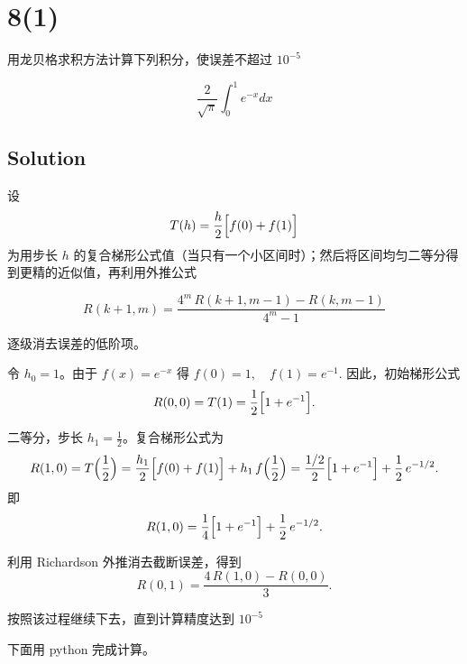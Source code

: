 \documentclass[11pt]{article}
\begin{document}
    \section{8(1)}\label{section}

用龙贝格求积方法计算下列积分，使误差不超过 \(10^{-5}\)

\[
\frac{2}{\sqrt \pi} \int_0^1e^{-x} dx
\]

\subsection{Solution}\label{solution}

设\\
\[
T(h)=\frac{h}{2}\Bigl[f(0)+f(1)\Bigr]
\] 为用步长 \(h\)
的复合梯形公式值（当只有一个小区间时）；然后将区间均匀二等分得到更精的近似值，再利用外推公式

\[
R(k+1, m)=\frac{4^m\,R(k+1, m-1)-R(k, m-1)}{4^m-1}
\]

逐级消去误差的低阶项。

令 \(h_0=1\)。由于 \(f(x)=e^{-x}\) 得 \(f(0)=1,\quad f(1)=e^{-1}\).
因此，初始梯形公式 \[
R(0,0)=T(1)=\frac{1}{2}\Bigl[1+e^{-1}\Bigr].
\]

二等分，步长 \(h_1=\tfrac{1}{2}\)。复合梯形公式为 \[
R(1,0)=T\Bigl(\frac{1}{2}\Bigr)
=\frac{h_1}{2}\Bigl[f(0)+f(1)\Bigr] + h_1\,f\Bigl(\frac{1}{2}\Bigr)
=\frac{1/2}{2}\Bigl[1+e^{-1}\Bigr] + \frac{1}{2}\,e^{-1/2}.
\] 即\\
\[
R(1,0)=\frac{1}{4}\Bigl[1+e^{-1}\Bigr]+\frac{1}{2}\,e^{-1/2}.
\]

利用 Richardson 外推消去截断误差，得到\\
\[
R(0,1)=\frac{4\,R(1,0)-R(0,0)}{3}.
\]

按照该过程继续下去，直到计算精度达到 \(10^{-5}\)

下面用 python 完成计算。
\end{document}
